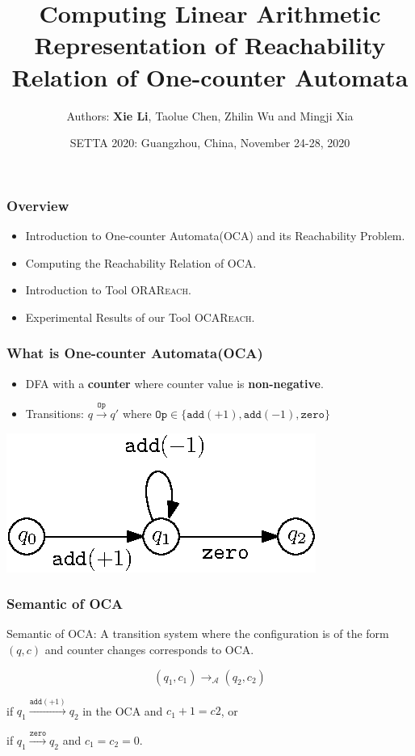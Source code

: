 \documentclass[11pt]{beamer}
\title{Computing Linear Arithmetic Representation of Reachability Relation  of One-counter Automata}
\author{
    Authors: \textbf{Xie Li}, Taolue Chen, Zhilin Wu and Mingji Xia
}
\date{SETTA 2020: Guangzhou, China, November 24-28, 2020}
\begin{document}
\maketitle
\begin{frame}\frametitle{Overview}
\begin{itemize}
\item Introduction to One-counter Automata(OCA) and its Reachability Problem.
\pause
\item Computing the Reachability Relation of OCA.
\pause
\item Introduction to Tool \textsc{ORAReach}.

\item Experimental Results of our Tool \textsc{OCAReach}.

\end{itemize}
\end{frame}


\begin{frame}\frametitle{What is One-counter Automata(OCA)}
\begin{itemize}

\item DFA with a \textbf{counter} where counter value is \textbf{non-negative}.
\pause
\item Transitions: $q\stackrel{\texttt{Op}}{\rightarrow} q'$ where $\texttt{Op}\in \{\texttt{add}(+1), \texttt{add}(-1), \texttt{zero}\}$
\end{itemize}
\pause
\begin{example}[OCA]
\begin{center}
\includegraphics[scale=1]{ocaexample.eps}
\end{center}


\end{example}

\end{frame}
\begin{frame}\frametitle{Semantic of OCA}

Semantic of OCA: A transition system where the configuration is of the form $(q,c)$ and counter changes corresponds to OCA.

\[(q_1, c_1) \rightarrow_\mathcal{A} (q_2,c_2)\]

if $q_1 \stackrel{\texttt{add}(+1)}{\longrightarrow} q_2$ in the OCA and $c_1 + 1 = c2$, or

if $q_1 \stackrel{\texttt{zero}}{\longrightarrow} q_2$ and $c_1 = c_2 = 0$.
\end{frame}
\end{document}
